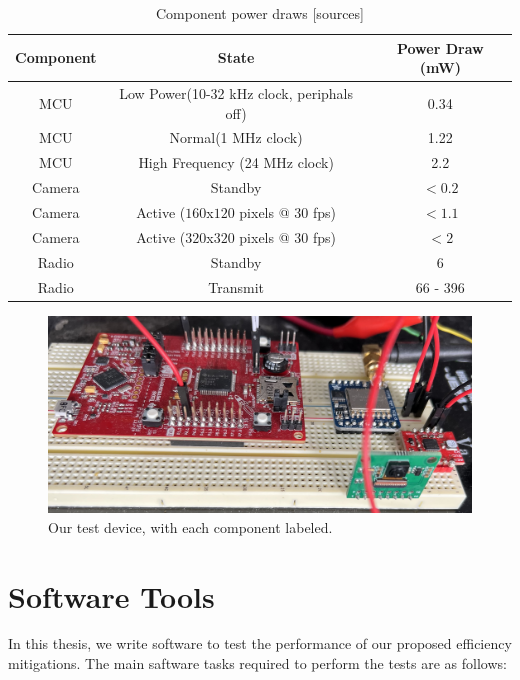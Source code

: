 \documentclass[twoside]{report}
\begin{document}
\begin{table}[ht]
\begin{center}
    \begin{tabular}{ |c|c|c| } 
     \hline
     \textbf{Component} & \textbf{State} & \textbf{Power Draw (mW)} \\
     \hline
     MCU & Low Power(10-32 kHz clock, periphals off) & 0.34 \\ 
     \hline
     MCU & Normal(1 MHz clock) & 1.22 \\ 
     \hline
     MCU & High Frequency (24 MHz clock) & 2.2 \\ 
     \hline
     Camera & Standby & $< 0.2$ \\
     \hline
     Camera & Active ($160$x$120$ pixels @ $30$ fps) & $< 1.1$ \\
     \hline
     Camera & Active ($320$x$320$ pixels @ $30$ fps) & $< 2$ \\
     \hline
     Radio & Standby & 6 \\
     \hline
     Radio & Transmit & 66 - 396 \\
     \hline
    \end{tabular}
    \caption{Component power draws [sources]}
\end{center} \label{tab:power}
\end{table}

\begin{figure}[ht]
    \centering
    \includegraphics[width=0.8\linewidth]{method/device.jpg}
    \caption{Our test device, with each component labeled.}
    \label{fig:device}
\end{figure}

\section{Software Tools}
In this thesis, we write software to test the performance of our proposed efficiency mitigations. 
The main saftware tasks required to perform the tests are as follows:
\end{document}
